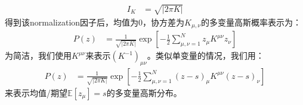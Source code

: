 \begin{equation}
    \begin{split}
        I_K 
        &= \sqrt{
            \left | 
            2\pi K
            \right |
            }
    \end{split}
\end{equation}
得到该normalization因子后，均值为$0$，协方差为$K_{\mu,\nu}$的多变量高斯概率表示为：
\begin{equation}
    \begin{split}
        P(z)
        &= \frac{1}{\sqrt{\left | 2\pi K\right |}}
        \exp{\left[
            - \frac{1}{2} \sum_{\mu,\nu=1}^{N} 
            {z_{\mu}K^{\mu\nu}z_{\nu}}
        \right]}
    \end{split}
\end{equation}
为简洁，我们使用$K^{\mu\nu}$来表示$(K^{-1})_{\mu\nu}$。类似单变量的情况，我们用：
\begin{equation}
    \begin{split}
        P(z)
        &= \frac{1}{\sqrt{\left | 2\pi K\right |}}
        \exp{\left[
            - \frac{1}{2} \sum_{\mu,\nu=1}^{N} 
            {(z-s)_{\mu}K^{\mu\nu}(z-s)_{\nu}}
        \right]}
    \end{split}
\end{equation}
来表示均值/期望$\mathbb{E}[z_\mu]=s$的多变量高斯分布。

